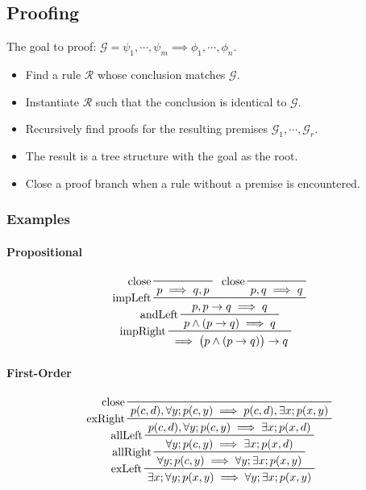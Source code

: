 \documentclass[a4paper, 11pt, accentcolor = tud3b]{tudreport}
\begin{document}
			\subsection{Proofing}
				The goal to proof: \( \mathcal{G} = \psi_1, \cdots, \psi_m \implies \phi_1, \cdots, \phi_n \).
				\begin{itemize}
					\item Find a rule \( \mathcal{R} \) whose conclusion matches \( \mathcal{G} \).
					\item Instantiate \( \mathcal{R} \) such that the conclusion is identical to \( \mathcal{G} \).
					\item Recursively find proofs for the resulting premises \( \mathcal{G}_1, \cdots, \mathcal{G}_r \).
					\item The result is a tree structure with the goal as the root.
					\item Close a proof branch when a rule without a premise is encountered.
				\end{itemize}

				\subsubsection{Examples}
					\paragraph{Propositional}
						\begin{equation*}
							\prftree[l]{impRight}
								{ \prftree[l]{andLeft}
									{ \prftree[l]{impLeft}
										{ \prftree[l]{close}
											{p \implies q, p} }
										{ \prftree[l]{close}
											{p, q \implies q} }
										{p, p \to q \implies q} }
									{p \land (p \to q) \implies q} }
								{\implies \big(p \land (p \to q)\big) \to q}
						\end{equation*}

					\paragraph{First-Order}
						\begin{equation*}
							\prftree[l]{exLeft}
								{ \prftree[l]{allRight}
									{ \prftree[l]{allLeft}
										{ \prftree[l]{exRight}
											{ \prftree[l]{close}{p(c, d), \forall y; p(c, y) \implies p(c, d), \exists x; p(x, y)} }
												{p(c, d), \forall y; p(c, y) \implies \exists x; p(x, d)} }
										{\forall y; p(c, y) \implies \exists x; p(x, d)} }
									{\forall y; p(c, y) \implies \forall y; \exists x; p(x, y)} }
								{\exists x; \forall y; p(x, y) \implies \forall y; \exists x; p(x, y)}
						\end{equation*}
\end{document}

